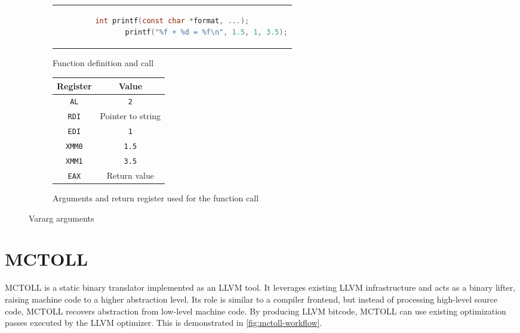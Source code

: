 \begin{figure}[htpb]
    \centering
    \begin{subfigure}{.65\textwidth}
        \centering
        \begin{tabular}{c}
            \begin{lstlisting}[language=C]
                int printf(const char *format, ...);
                printf("%f + %d = %f\n", 1.5, 1, 3.5);
            \end{lstlisting}
        \end{tabular}
        \caption{Function definition and call}
    \end{subfigure}
    \begin{subfigure}{.3\textwidth}
        \centering
        \begin{tabular}{|c|c|}
            \hline
            Register      & Value             \\
            \hline
            \texttt{AL}   & \texttt{2}        \\
            \texttt{RDI}  & Pointer to string \\
            \texttt{EDI}  & \texttt{1}        \\
            \texttt{XMM0} & \texttt{1.5}      \\
            \texttt{XMM1} & \texttt{3.5}      \\
            \hline
            \texttt{EAX}  & Return value      \\
            \hline
        \end{tabular}
        \caption{Arguments and return register used for the function call}
    \end{subfigure}
    \caption{Vararg arguments}
    \label{tab:param-reg-ex03}
\end{figure}


\section{MCTOLL}\label{sec:mctoll}

MCTOLL is a static binary translator implemented as an LLVM tool.
It leverages existing LLVM infrastructure and acts as a binary lifter, raising machine code to a higher abstraction level.
Its role is similar to a compiler frontend, but instead of processing high-level source code, MCTOLL recovers abstraction from low-level machine code.
By producing LLVM bitcode, MCTOLL can use existing optimization passes executed by the LLVM optimizer.
This is demonstrated in \cref{fig:mctoll-workflow}.

